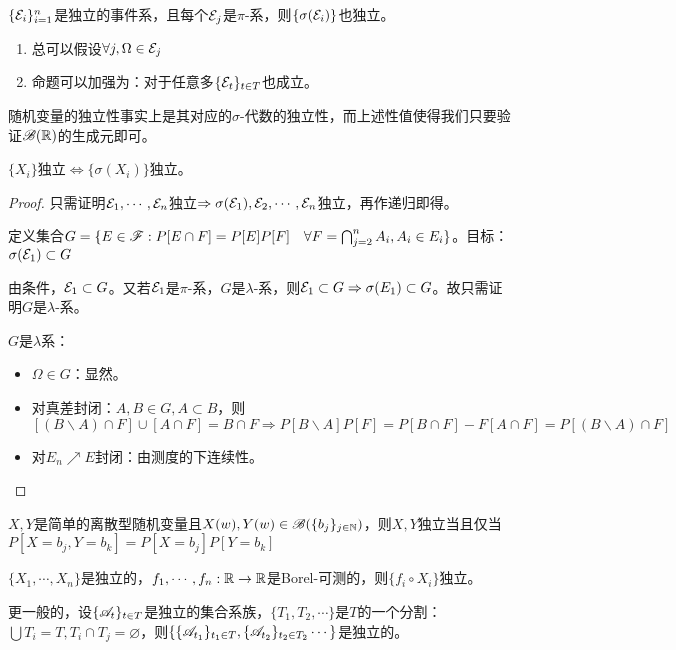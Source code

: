 \documentclass{ctexbook}
\begin{document}
\begin{Prop}
  $\{\mathcal{E}_{i}\}_{i=1}^{n}$是独立的事件系，且每个$\mathcal{E}_{j}$是$\pi$-系，则$\{\sigma(\mathcal{E}_{i})\}$也独立。
\end{Prop}

\begin{Rmk}
  \begin{enumerate}
  \item 总可以假设$\forall j,\Omega\in \mathcal{E}_{j}$
  \item 命题可以加强为：对于任意多$\{\mathcal{E}_{t}\}_{t\in T}$也成立。
  \end{enumerate}
\end{Rmk}

随机变量的独立性事实上是其对应的$\sigma$-代数的独立性，而上述性值使得我们只要验证$\mathscr{B}(\mathbb{R})$的生成元即可。

\begin{Cor}
  $\{X_{i}\}$独立$\Leftrightarrow \{\sigma(X_{i})\}$独立。
\end{Cor}

\begin{proof}
  只需证明$\mathcal{E}_{1},\cdots,\mathcal{E}_{n}$独立$\Rightarrow \sigma(\mathcal{E}_{1}),\mathcal{E}_{2},\cdots,\mathcal{E}_{n}$独立，再作递归即得。

  定义集合$G=\{E\in\mathscr{F}:P[E\cap F]=P[E]P[F]\quad\forall F=\bigcap_{j=2}^{n}A_{i},A_{i}\in E_{i}\}$。目标：$\sigma(\mathcal{E}_{1})\subset G$

  由条件，$\mathcal{E}_{1}\subset G$。又若$\mathcal{E}_{1}$是$\pi$-系，$G$是$\lambda$-系，则$\mathcal{E}_{1}\subset G\Rightarrow \sigma(E_{1})\subset G$。故只需证明$G$是$\lambda$-系。

  $G$是$\lambda$系：
  \begin{itemize}
  \item $\Omega\in G$：显然。
  \item 对真差封闭：$A,B\in G,A\subset B$，则$[(B\backslash A)\cap F]\cup[A\cap F]=B\cap F\Rightarrow P[B\backslash A]P[F]=P[B\cap F]-F[A\cap F]=P[(B\backslash A)\cap F]$
  \item 对$E_{n}\nearrow E$封闭：由测度的下连续性。
  \end{itemize}
\end{proof}

\begin{Eg}
  $X,Y$是简单的离散型随机变量且$X(w),Y(w)\in \mathscr{B}(\{b_{j}\}_{j\in\mathbb{N}})$，则$X,Y$独立当且仅当$P[X=b_{j},Y=b_{k}]=P[X=b_{j}]P[Y=b_{k}]$
\end{Eg}

\begin{Eg}
  $\{X_{1},\cdots,X_{n}\}$是独立的，$f_{1},\cdots,f_{n}:\mathbb{R}\to\mathbb{R}$是Borel-可测的，则$\{f_{i}\circ X_{i}\}$独立。

  更一般的，设$\{\mathscr{A}_{t}\}_{t\in T}$是独立的集合系族，$\{T_{1},T_{2},\cdots\}$是$T$的一个分割：$\bigcup T_{i}=T,T_{i}\cap T_{j}=\varnothing$，则$\{\{\mathscr{A}_{t_{1}}\}_{t_{1}\in T},\{\mathscr{A}_{t_{2}}\}_{t_{2}\in T_{2}}\cdots\}$是独立的。
\end{Eg}
\end{document}
